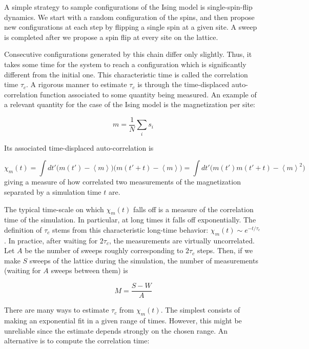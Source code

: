 A simple strategy to sample configurations of the Ising model is single-spin-flip dynamics.
We start with a random configuration of the spins, and then propose new configurations at each step by flipping a single spin at a given site.
A sweep is completed after we propose a spin flip at every site on the lattice.

Consecutive configurations generated by this chain differ only slightly.
Thus, it takes some time for the system to reach a configuration which is significantly different from the initial one.
This characteristic time is called the correlation time $\tau_c$.
A rigorous manner to estimate $\tau_c$ is through the time-displaced auto-correlation function associated to some quantity being measured.
An example of a relevant quantity for the case of the Ising model is the magnetization per site:

\begin{equation}
m = \frac{1}{N} \sum_i s_i
\end{equation}

Its associated time-displaced auto-correlation is

\begin{equation}
\chi_m ( t ) = \int dt' \bigg( m ( t' ) - \left\langle m \right\rangle \bigg) \bigg( m ( t' + t ) - \left\langle m \right\rangle \bigg) = \int dt' \bigg( m ( t' ) m ( t' + t ) - \left\langle m \right\rangle^2 \bigg)
\end{equation}
giving a measure of how correlated two measurements of the magnetization separated by a simulation time $t$ are.

The typical time-scale on which $\chi_m (t)$ falls off is a measure of the correlation time of the simulation.
In particular, at long times it falls off exponentially.
The definition of $\tau_c$ stems from this characteristic long-time behavior: $\chi_m (t) \sim e^{-t / \tau_c}$.
In practice, after waiting for $2\tau_c$, the measurements are virtually uncorrelated.
Let $A$ be the number of sweeps roughly  corresponding to $2\tau_c$ steps.
Then, if we make $S$ sweeps of the lattice during the simulation, the number of measurements (waiting for $A$ sweeps between them) is

\begin{equation}
M = \frac{S - W}{A}
\end{equation}

There are many ways to estimate $\tau_c$ from $\chi_m (t)$.
The simplest consists of making an exponential fit in a given range of times.
However, this might be unreliable since the estimate depends strongly on the chosen range.
An alternative is to compute the  correlation time:

